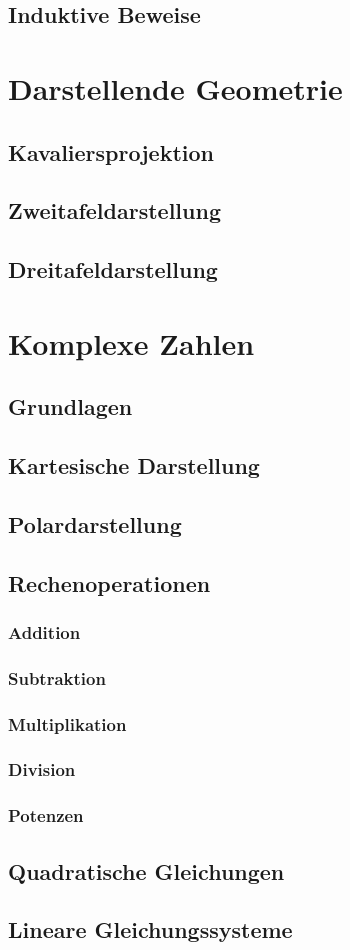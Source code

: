 \documentclass[12pt,a4paper,oneside]{scrbook}
\begin{document}
\section{Induktive Beweise}

\chapter{Darstellende Geometrie}
\section{Kavaliersprojektion}
\section{Zweitafeldarstellung}
\section{Dreitafeldarstellung}

\chapter{Komplexe Zahlen}
\section{Grundlagen}

\section{Kartesische Darstellung}

\section{Polardarstellung}

\section{Rechenoperationen}
\subsection{Addition}
\subsection{Subtraktion}
\subsection{Multiplikation}
\subsection{Division}
\subsection{Potenzen}

\section{Quadratische Gleichungen}

\section{Lineare Gleichungssysteme}
\end{document}
